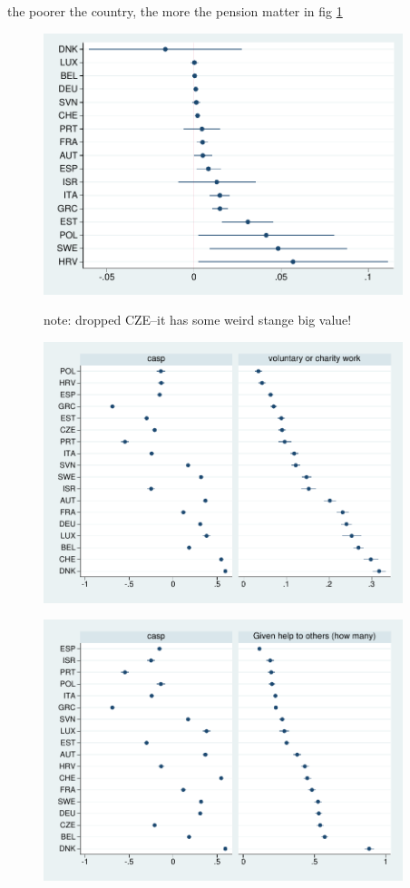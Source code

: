 \documentclass[10pt, letterpaper]{article}
\begin{document}
\begin{spacing}{1.4}
the poorer the country, the more the pension matter in fig \ref{pen-means}

\begin{figure}[H]
 \includegraphics[height=3in]{tmp/pen-means.pdf}\centering\label{pen-means}
\caption{note: dropped CZE--it has some weird stange big value!}
\end{figure}


\begin{figure}[H]
 \includegraphics[height=3in]{tmp/casp-volCha-means.pdf}\centering\label{casp-volCha-means}
\caption{}
\end{figure}


\begin{figure}[H]
 \includegraphics[height=3in]{tmp/casp-ghto-means.pdf}\centering\label{casp-ghto-means}
\caption{}
\end{figure}


\end{spacing}
\end{document}
